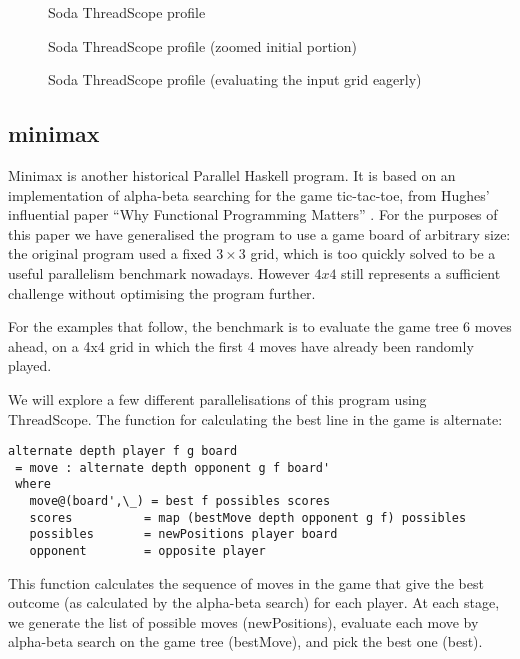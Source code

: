 \documentclass[twocolumn,9pt]{sigplanconf}
\newcommand{\codef}[1]{{\fontfamily{cmss}\small#1}}
\let\cite=\citep
\begin{document}
\begin{figure}
\caption{Soda ThreadScope profile}
\label{f:soda-threadscope}
\end{figure}

\begin{figure}
\caption{Soda ThreadScope profile (zoomed initial portion)}
\label{f:soda-threadscope2}
\end{figure}

\begin{figure}
\caption{Soda ThreadScope profile (evaluating the input grid eagerly)}
\label{f:soda-threadscope3}
\end{figure}

\subsection{minimax}

Minimax is another historical Parallel Haskell program.  It is based
on an implementation of alpha-beta searching for the game tic-tac-toe,
from Hughes' influential paper ``Why Functional Programming Matters''
\cite{why}.  For the purposes of this paper we have generalised the
program to use a game board of arbitrary size: the original program
used a fixed $3\times3$ grid, which is too quickly solved to be a useful
parallelism benchmark nowadays.  However $4x4$ still represents a
sufficient challenge without optimising the program further.

For the examples that follow, the benchmark is to evaluate the game
tree 6 moves ahead, on a 4x4 grid in which the first 4 moves have
already been randomly played.

We will explore a few different parallelisations of this program using
ThreadScope.  The function for calculating the best line in the game
is \codef{alternate}:

\begin{lstlisting}
alternate depth player f g board
 = move : alternate depth opponent g f board'
 where
   move@(board',\_) = best f possibles scores
   scores          = map (bestMove depth opponent g f) possibles
   possibles       = newPositions player board
   opponent        = opposite player
\end{lstlisting}

This function calculates the sequence of moves in the game that give
the best outcome (as calculated by the alpha-beta search) for each
player.  At each stage, we generate the list of possible moves
(\codef{newPositions}), evaluate each move by alpha-beta search on the
game tree (\codef{bestMove}), and pick the best one (\codef{best}).
\end{document}
